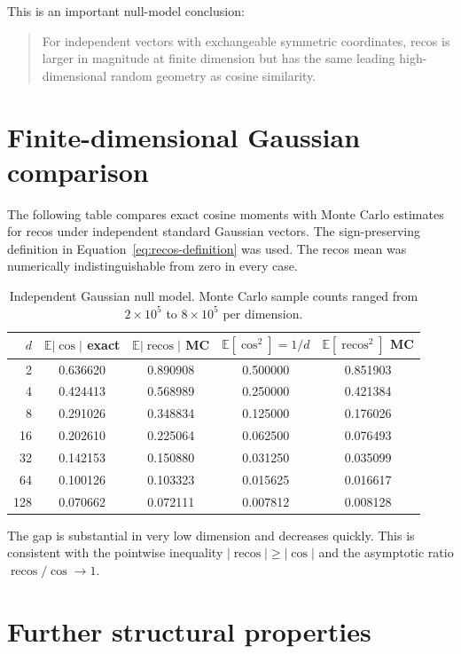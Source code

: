 \documentclass[11pt,a4paper]{article}
\newcommand{\E}{\mathbb{E}}
\newcommand{\recos}{\operatorname{recos}}
\newcommand{\cosim}{\operatorname{cos}}
\begin{document}
This is an important null-model conclusion:

\begin{quote}
For independent vectors with exchangeable symmetric coordinates, recos is larger in magnitude at finite dimension but has the same leading high-dimensional random geometry as cosine similarity.
\end{quote}

\section{Finite-dimensional Gaussian comparison}

The following table compares exact cosine moments with Monte Carlo estimates for recos under independent standard Gaussian vectors. The sign-preserving definition in Equation~\eqref{eq:recos-definition} was used. The recos mean was numerically indistinguishable from zero in every case.

\begin{table}[ht]
\centering
\small
\begin{tabular}{rcccc}
\toprule
$d$
& $\E|\cosim|$ exact
& $\E|\recos|$ MC
& $\E[\cosim^2]=1/d$
& $\E[\recos^2]$ MC\\
\midrule
2   & 0.636620 & 0.890908 & 0.500000 & 0.851903\\
4   & 0.424413 & 0.568989 & 0.250000 & 0.421384\\
8   & 0.291026 & 0.348834 & 0.125000 & 0.176026\\
16  & 0.202610 & 0.225064 & 0.062500 & 0.076493\\
32  & 0.142153 & 0.150880 & 0.031250 & 0.035099\\
64  & 0.100126 & 0.103323 & 0.015625 & 0.016617\\
128 & 0.070662 & 0.072111 & 0.007812 & 0.008128\\
\bottomrule
\end{tabular}
\caption{Independent Gaussian null model. Monte Carlo sample counts ranged from $2\times10^5$ to $8\times10^5$ per dimension.}
\end{table}

The gap is substantial in very low dimension and decreases quickly. This is consistent with the pointwise inequality $|\recos|\geq|\cosim|$ and the asymptotic ratio $\recos/\cosim\to1$.

\section{Further structural properties}
\end{document}
